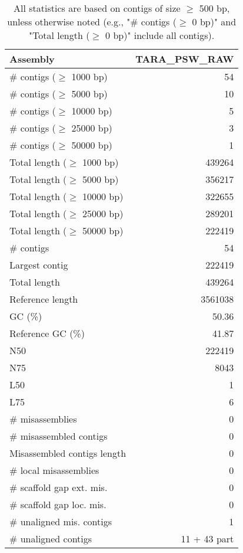 \documentclass[12pt,a4paper]{article}
\begin{document}
\begin{table}[ht]
\begin{center}
\caption{All statistics are based on contigs of size $\geq$ 500 bp, unless otherwise noted (e.g., "\# contigs ($\geq$ 0 bp)" and "Total length ($\geq$ 0 bp)" include all contigs).}
\begin{tabular}{|l*{1}{|r}|}
\hline
Assembly & TARA\_PSW\_RAW \\ \hline
\# contigs ($\geq$ 1000 bp) & 54 \\ \hline
\# contigs ($\geq$ 5000 bp) & 10 \\ \hline
\# contigs ($\geq$ 10000 bp) & 5 \\ \hline
\# contigs ($\geq$ 25000 bp) & 3 \\ \hline
\# contigs ($\geq$ 50000 bp) & 1 \\ \hline
Total length ($\geq$ 1000 bp) & 439264 \\ \hline
Total length ($\geq$ 5000 bp) & 356217 \\ \hline
Total length ($\geq$ 10000 bp) & 322655 \\ \hline
Total length ($\geq$ 25000 bp) & 289201 \\ \hline
Total length ($\geq$ 50000 bp) & 222419 \\ \hline
\# contigs & 54 \\ \hline
Largest contig & 222419 \\ \hline
Total length & 439264 \\ \hline
Reference length & 3561038 \\ \hline
GC (\%) & 50.36 \\ \hline
Reference GC (\%) & 41.87 \\ \hline
N50 & 222419 \\ \hline
N75 & 8043 \\ \hline
L50 & 1 \\ \hline
L75 & 6 \\ \hline
\# misassemblies & 0 \\ \hline
\# misassembled contigs & 0 \\ \hline
Misassembled contigs length & 0 \\ \hline
\# local misassemblies & 0 \\ \hline
\# scaffold gap ext. mis. & 0 \\ \hline
\# scaffold gap loc. mis. & 0 \\ \hline
\# unaligned mis. contigs & 1 \\ \hline
\# unaligned contigs & 11 + 43 part \\ \hline

\end{tabular}
\end{center}
\end{table}
\end{document}
